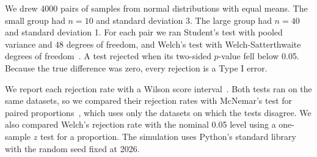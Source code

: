 We drew 4000 pairs of samples from normal distributions with equal means. The small group had $n = 10$ and standard deviation 3. The large group had $n = 40$ and standard deviation 1. For each pair we ran Student's test with pooled variance and 48 degrees of freedom, and Welch's test with Welch-Satterthwaite degrees of freedom~\citep{welch1947generalization}. A test rejected when its two-sided $p$-value fell below 0.05. Because the true difference was zero, every rejection is a Type I error.

We report each rejection rate with a Wilson score interval~\citep{wilson1927probable}. Both tests ran on the same datasets, so we compared their rejection rates with McNemar's test for paired proportions~\citep{mcnemar1947note}, which uses only the datasets on which the tests disagree. We also compared Welch's rejection rate with the nominal 0.05 level using a one-sample $z$ test for a proportion. The simulation uses Python's standard library with the random seed fixed at 2026.
